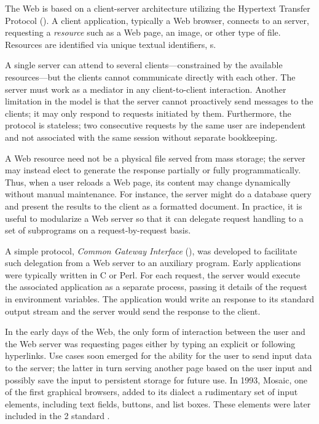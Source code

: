 The Web is based on a client-server architecture utilizing the Hypertext Transfer Protocol (). A client application, typically a Web browser, connects to an  server, requesting a \emph{resource} such as a Web page, an image, or other type of file. Resources are identified via unique textual identifiers, s. \cite{HTTP11}

A single server can attend to several clients---constrained by the available resources---but the clients cannot communicate directly with each other. The server must work as a mediator in any client-to-client interaction. Another limitation in the  model is that the server cannot proactively send messages to the clients; it may only respond to requests initiated by them. Furthermore, the protocol is stateless; two consecutive requests by the same user are independent and not associated with the same session without separate bookkeeping.

A Web resource need not be a physical file served from mass storage; the server may instead elect to generate the response partially or fully programmatically. Thus, when a user reloads a Web page, its content may change dynamically without manual maintenance. For instance, the server might do a database query and present the results to the client as a formatted  document. In practice, it is useful to modularize a Web server so that it can delegate request handling to a set of subprograms on a request-by-request basis. 

A simple protocol, \emph{Common Gateway Interface} (), was developed to facilitate such delegation from a Web server to an auxiliary program. Early  applications were typically written in C or Perl. For each request, the server would execute the associated  application as a separate process, passing it details of the request in environment variables. The application would write an  response to its standard output stream and the server would send the response to the client. \cite{CGI11}

In the early days of the Web, the only form of interaction between the user and the Web server was requesting pages either by typing an explicit  or following hyperlinks. Use cases soon emerged for the ability for the user to send input data to the server; the latter in turn serving another page based on the user input and possibly save the input to persistent storage for future use. In \num{1993}, Mosaic, one of the first graphical browsers, added to its  dialect a rudimentary set of input elements, including text fields, buttons, and list boxes. These elements were later included in the  2 standard \cite{HTML20}.

